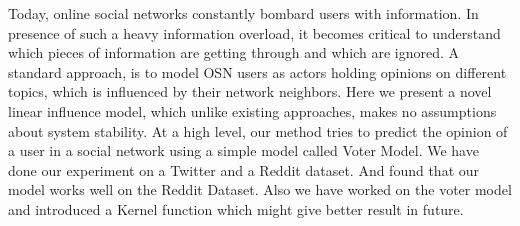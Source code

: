 Today, online social networks constantly bombard users with information. In presence of
such a heavy information overload, it becomes critical to understand which pieces of information
are getting through and which are ignored. A standard approach, is to model OSN users as
actors holding opinions on different topics, which is influenced by their network neighbors.
Here we present a novel linear influence model, which unlike existing approaches, makes no
assumptions about system stability. At a high level, our method tries to predict the opinion of
a user in a social network using a simple model called Voter Model. We have done our experiment on a Twitter and a Reddit dataset. And found that our model works well on the Reddit Dataset. Also we have worked on the voter model and introduced a Kernel function which might give better result in future.